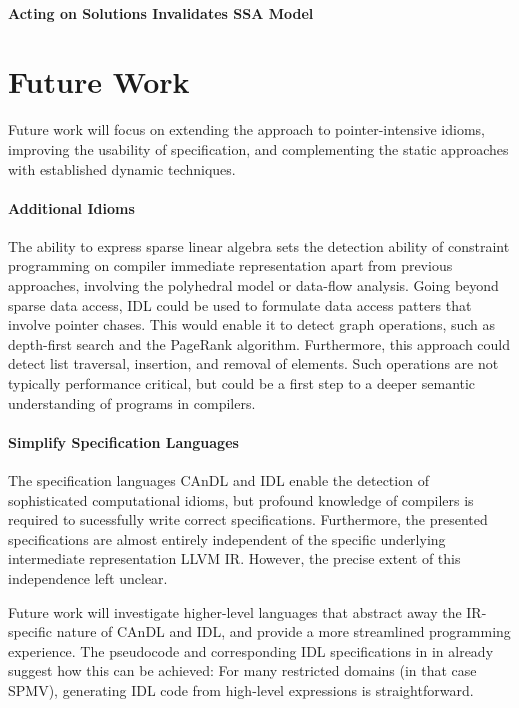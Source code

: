     \paragraph*{Acting on Solutions Invalidates SSA Model}

\section{Future Work}

    Future work will focus on extending the approach to pointer-intensive
    idioms, improving the usability of specification, and complementing
    the static approaches with established dynamic techniques.

    \paragraph*{Additional Idioms}
    The ability to express sparse linear algebra sets the detection ability of
    constraint programming on compiler immediate representation apart from
    previous approaches, involving the polyhedral model or data-flow analysis.
    Going beyond sparse data access, IDL could be used to formulate data access
    patters that involve pointer chases.
    This would enable it to detect graph operations, such as depth-first search
    and the PageRank algorithm.
    Furthermore, this approach could detect list traversal, insertion, and
    removal of elements.
    Such operations are not typically performance critical, but could be a first
    step to a deeper semantic understanding of programs in compilers.

    \paragraph*{Simplify Specification Languages}
    The specification languages CAnDL and IDL enable the detection of
    sophisticated computational idioms, but profound knowledge of compilers is
    required to sucessfully write correct specifications. 
    Furthermore, the presented specifications are almost entirely independent of
    the specific underlying intermediate representation LLVM IR.
    However, the precise extent of this independence left unclear.

    Future work will investigate higher-level languages that abstract away the
    IR-specific nature of CAnDL and IDL, and provide a more streamlined
    programming experience.
    The pseudocode and corresponding IDL specifications in
     in  already
    suggest how this can be achieved:
    For many restricted domains (in that case SPMV), generating IDL code from
    high-level expressions is straightforward.

